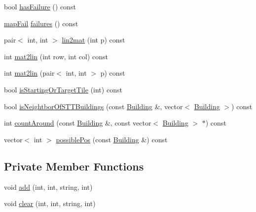 \begin{DoxyCompactItemize}
\item 
bool \hyperlink{classghost_1_1WallinDomain_a6f7e5faed20866178aef2a304f0a0856}{has\-Failure} () const 
\item 
\hyperlink{namespaceghost_af44c393431f46e255b1c303cd50854b8}{map\-Fail} \hyperlink{classghost_1_1WallinDomain_a070f1fe50460d46a85e6a497b09b8626}{failures} () const 
\item 
pair$<$ int, int $>$ \hyperlink{classghost_1_1WallinDomain_a99033370b8ec23bd76ae616573468a58}{lin2mat} (int p) const 
\item 
int \hyperlink{classghost_1_1WallinDomain_aa046dc48e23d97c260e21fb7671800c5}{mat2lin} (int row, int col) const 
\item 
int \hyperlink{classghost_1_1WallinDomain_a79ed19b2aaab5d00a7103190f83ea8ba}{mat2lin} (pair$<$ int, int $>$ p) const 
\item 
bool \hyperlink{classghost_1_1WallinDomain_aefedba561d23ec8ae7a9f3dca7b58565}{is\-Starting\-Or\-Target\-Tile} (int) const 
\item 
bool \hyperlink{classghost_1_1WallinDomain_a889f4bf4cbc323e7ece3e05a96f96691}{is\-Neightbor\-Of\-S\-T\-T\-Buildings} (const \hyperlink{classghost_1_1Building}{Building} \&, vector$<$ \hyperlink{classghost_1_1Building}{Building} $>$) const 
\item 
int \hyperlink{classghost_1_1WallinDomain_ad67a6d2ae03800594475e081af2d5136}{count\-Around} (const \hyperlink{classghost_1_1Building}{Building} \&, const vector$<$ \hyperlink{classghost_1_1Building}{Building} $>$ $\ast$) const 
\item 
vector$<$ int $>$ \hyperlink{classghost_1_1WallinDomain_ab4441d234f628c487742480107fcdd6d}{possible\-Pos} (const \hyperlink{classghost_1_1Building}{Building} \&) const 
\end{DoxyCompactItemize}
\subsection*{Private Member Functions}
\begin{DoxyCompactItemize}
\item 
void \hyperlink{classghost_1_1WallinDomain_a6fcb3370e7a7df62156c556b381c78f7}{add} (int, int, string, int)
\item 
void \hyperlink{classghost_1_1WallinDomain_ae6903c1353bafc1269ad1fa8fcd158ee}{clear} (int, int, string, int)
\end{DoxyCompactItemize}
